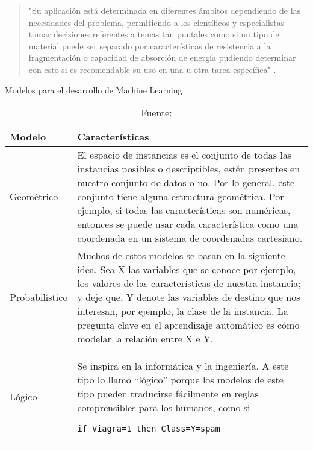 \begin{quote}
    "Su aplicación está determinada en diferentes ámbitos dependiendo de las necesidades del problema, permitiendo a los científicos y especialistas tomar decisiones referentes a temas tan puntales como si un tipo de material puede ser separado por características de resistencia a la fragmentación o capacidad de absorción de energía pudiendo determinar con esto si es recomendable su uso en una u otra tarea específica" \citep[p.42]{salamanca2021}.
\end{quote}

\begin{table}[htbp]
\centering
\caption{Modelos para el desarrollo de Machine Learning}
\label{tab:modelos}
\begin{tabular}{|l|p{10cm}|}
\hline
\textbf{Modelo} & \textbf{Características} \\
\hline
Geométrico & El espacio de instancias es el conjunto de todas las instancias posibles o descriptibles, estén presentes en nuestro conjunto de datos o no. Por lo general, este conjunto tiene alguna estructura geométrica. Por ejemplo, si todas las características son numéricas, entonces se puede usar cada característica como una coordenada en un sistema de coordenadas cartesiano. \\
\hline
Probabilístico & Muchos de estos modelos se basan en la siguiente idea. Sea X las variables que se conoce por ejemplo, los valores de las características de nuestra instancia; y deje que, Y denote las variables de destino que nos interesan, por ejemplo, la clase de la instancia. La pregunta clave en el aprendizaje automático es cómo modelar la relación entre X e Y. \\
\hline
Lógico & Se inspira en la informática y la ingeniería. A este tipo lo llamo “lógico” porque los modelos de este tipo pueden traducirse fácilmente en reglas comprensibles para los humanos, como si \begin{verbatim}
if Viagra=1 then Class=Y=spam
\end{verbatim} \\
\hline
\end{tabular}
\caption*{\footnotesize Fuente: \citet{salamanca2021}}
\end{table}

